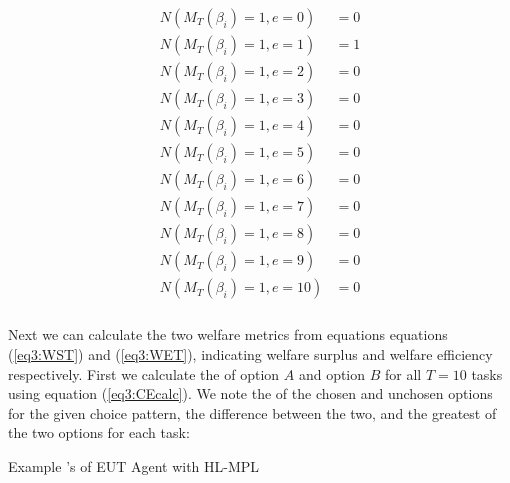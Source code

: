 \documentclass[../main.tex]{subfiles}
\begin{document}
\begin{align}
	\label{eq3:example_NMB}
	\begin{split}
		N( M_T(\beta_i) = 1, e = 0 )  &= 0 \\
		N( M_T(\beta_i) = 1, e = 1 )  &= 1 \\
		N( M_T(\beta_i) = 1, e = 2 )  &= 0 \\
		N( M_T(\beta_i) = 1, e = 3 )  &= 0 \\
		N( M_T(\beta_i) = 1, e = 4 )  &= 0 \\
		N( M_T(\beta_i) = 1, e = 5 )  &= 0 \\
		N( M_T(\beta_i) = 1, e = 6 )  &= 0 \\
		N( M_T(\beta_i) = 1, e = 7 )  &= 0 \\
		N( M_T(\beta_i) = 1, e = 8 )  &= 0 \\
		N( M_T(\beta_i) = 1, e = 9 )  &= 0 \\
		N( M_T(\beta_i) = 1, e = 10 ) &= 0 \\
	\end{split}
\end{align}

\noindent Next we can calculate the two welfare metrics from equations equations (\ref{eq3:WST}) and (\ref{eq3:WET}), indicating welfare surplus and welfare efficiency respectively.
First we calculate the {\CE} of option $A$ and option $B$ for all $T = 10$ tasks using equation (\ref{eq3:CEcalc}).
We note the {\CE} of the chosen and unchosen options for the given choice pattern, the difference between the two, and the greatest {\CE} of the two options for each task:

\begin{table}[ht]
	\centering
	\setlength{\tabcolsep}{1pt}
	\caption{ Example {\CE}'s of EUT Agent with HL-MPL}
	\label{tb:example_CE}
	\begin{adjustbox}{width=1\textwidth}
	\end{adjustbox}
\end{table}
\end{document}
